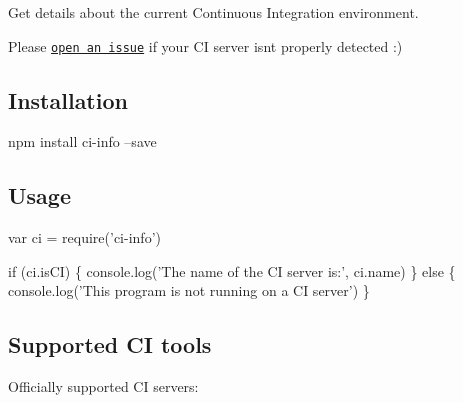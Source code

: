 Get details about the current Continuous Integration environment.

Please \href{https://github.com/watson/ci-info/issues}{\tt open an issue} if your CI server isn\textquotesingle{}t properly detected \+:)

\href{https://travis-ci.org/watson/ci-info}{\tt } \href{https://github.com/feross/standard}{\tt }

\subsection*{Installation}


\begin{DoxyCode}
npm install ci-info --save
\end{DoxyCode}


\subsection*{Usage}


\begin{DoxyCode}
var ci = require('ci-info')

if (ci.isCI) \{
  console.log('The name of the CI server is:', ci.name)
\} else \{
  console.log('This program is not running on a CI server')
\}
\end{DoxyCode}


\subsection*{Supported CI tools}

Officially supported CI servers\+:


